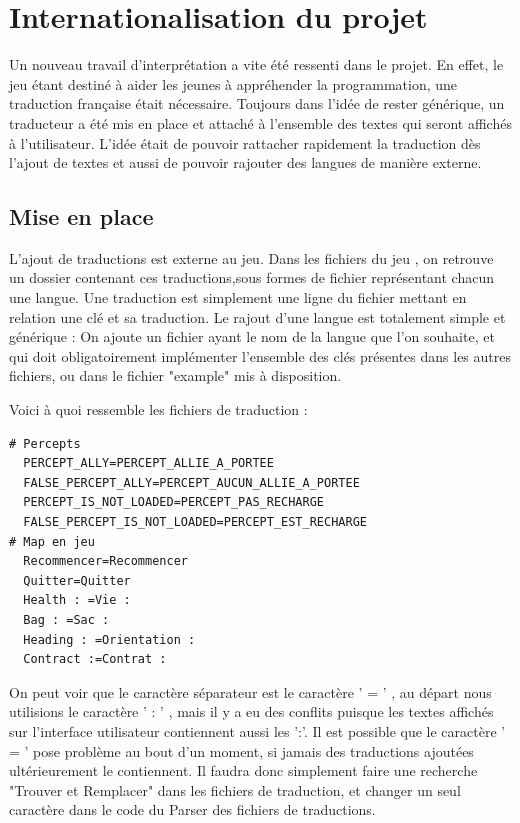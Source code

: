 \documentclass{report}
\begin{document}
\section{Internationalisation du projet}

Un nouveau travail d'interprétation a vite été ressenti dans le projet. En effet, le jeu étant destiné à aider les jeunes à appréhender la programmation, une traduction française était nécessaire.
Toujours dans l'idée de rester générique, un traducteur a été mis en place et attaché à l'ensemble des textes qui seront affichés à l'utilisateur. L’idée était de pouvoir rattacher rapidement la traduction dès l’ajout de textes et aussi de pouvoir rajouter des langues de manière externe.

\paragraph{}
\subsection{Mise en place}

L'ajout de traductions est externe au jeu.
Dans les fichiers du jeu , on retrouve un dossier contenant ces traductions,sous formes de fichier représentant chacun une langue.
Une traduction est simplement une ligne du fichier mettant en relation une clé et sa traduction.
Le rajout d'une langue est totalement simple et générique :
On ajoute un fichier ayant le nom de la langue que l'on souhaite, et qui doit obligatoirement implémenter l'ensemble des clés présentes dans les autres fichiers, ou dans le fichier "example" mis à disposition.

Voici à quoi ressemble les fichiers de traduction :
\begin{lstlisting}[frame=single]
# Percepts
  PERCEPT_ALLY=PERCEPT_ALLIE_A_PORTEE
  FALSE_PERCEPT_ALLY=PERCEPT_AUCUN_ALLIE_A_PORTEE
  PERCEPT_IS_NOT_LOADED=PERCEPT_PAS_RECHARGE
  FALSE_PERCEPT_IS_NOT_LOADED=PERCEPT_EST_RECHARGE
# Map en jeu
  Recommencer=Recommencer
  Quitter=Quitter
  Health : =Vie :
  Bag : =Sac :
  Heading : =Orientation :
  Contract :=Contrat :
\end{lstlisting}

On peut voir que le caractère séparateur est le caractère ' = ' , au départ nous utilisions le caractère ' : ' , mais il y a eu des conflits puisque les textes affichés sur l'interface utilisateur contiennent aussi les ':'.
Il est possible que le caractère ' = ' pose problème au bout d'un moment, si jamais des traductions ajoutées ultérieurement le contiennent. Il faudra donc simplement faire une recherche "Trouver et Remplacer" dans les fichiers de traduction, et changer un seul caractère dans le code du Parser des fichiers de traductions.
\end{document}
